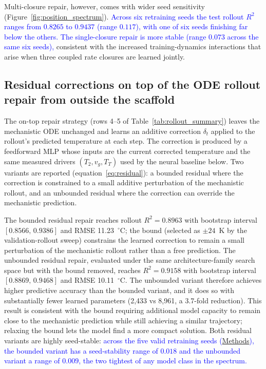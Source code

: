\documentclass[fleqn,10pt]{wlscirep}
\newcommand{\rev}[1]{\textcolor{blue}{#1}}
\newcommand{\Methods}{\hyperref[sec:methods]{Methods}}
\begin{document}
Multi-closure repair, however, comes with wider seed sensitivity (Figure~\ref{fig:position_spectrum}). \rev{Across six retraining seeds the test rollout $R^2$ ranges from $0.8265$ to $0.9437$ (range $0.117$), with one of six seeds finishing far below the others. The single-closure repair is more stable (range $0.073$ across the same six seeds),} consistent with the increased training-dynamics interactions that arise when three coupled rate closures are learned jointly.

\subsection*{Residual corrections on top of the ODE rollout repair from outside the scaffold}

The on-top repair strategy (rows 4--5 of Table~\ref{tab:rollout_summary}) leaves the mechanistic ODE unchanged and learns an additive correction $\delta_t$ applied to the rollout's predicted temperature at each step. The correction is produced by a feedforward MLP whose inputs are the current corrected temperature and the same measured drivers $(T_2, v_g, T_T)$ used by the neural baseline below. Two variants are reported (equation~\eqref{eq:residual}): a bounded residual where the correction is constrained to a small additive perturbation of the mechanistic rollout, and an unbounded residual where the correction can override the mechanistic prediction.

The bounded residual repair reaches rollout $R^2 = 0.8963$ with bootstrap interval $[0.8566,\,0.9386]$ and RMSE 11.23~$^\circ$C; the bound (selected as $\pm 24$~K by the validation-rollout sweep) constrains the learned correction to remain a small perturbation of the mechanistic rollout rather than a free prediction. The unbounded residual repair, evaluated under the same architecture-family search space but with the bound removed, reaches $R^2 = 0.9158$ with bootstrap interval $[0.8869,\,0.9468]$ and RMSE 10.11~$^\circ$C. The unbounded variant therefore achieves higher predictive accuracy than the bounded variant, and it does so with substantially fewer learned parameters (2{,}433 vs 8{,}961, a 3.7-fold reduction). This result is consistent with the bound requiring additional model capacity to remain close to the mechanistic prediction while still achieving a similar trajectory; relaxing the bound lets the model find a more compact solution. Both residual variants are highly seed-stable: \rev{across the five valid retraining seeds (\Methods), the bounded variant has a seed-stability range of $0.018$ and the unbounded variant a range of $0.009$, the two tightest of any model class in the spectrum.}
\end{document}
